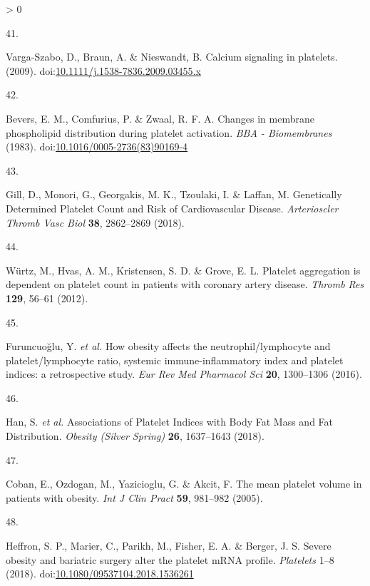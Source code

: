 \documentclass[11pt,twoside]{bristolthesis}
\newlength{\cslhangindent}
\newlength{\csllabelwidth}
\newenvironment{CSLReferences}[2] %
 {%
  \setlength{\parindent}{0pt}
  \ifodd #1 \everypar{\setlength{\hangindent}{\cslhangindent}}\ignorespaces\fi
  \ifnum #2 > 0
  \setlength{\parskip}{#2\baselineskip}
  \fi
 }%
 {}
\newcommand{\CSLLeftMargin}[1]{\parbox[t]{\csllabelwidth}{#1}}
\newcommand{\CSLRightInline}[1]{\parbox[t]{\linewidth - \csllabelwidth}{#1}\break}
\begin{document}
\begin{CSLReferences}{0}{0}
\leavevmode\hypertarget{ref-Varga-Szabo2009}{}%
\CSLLeftMargin{41. }
\CSLRightInline{Varga-Szabo, D., Braun, A. \& Nieswandt, B. {Calcium signaling in platelets}. (2009). doi:\href{https://doi.org/10.1111/j.1538-7836.2009.03455.x}{10.1111/j.1538-7836.2009.03455.x}}

\leavevmode\hypertarget{ref-Bevers1983}{}%
\CSLLeftMargin{42. }
\CSLRightInline{Bevers, E. M., Comfurius, P. \& Zwaal, R. F. A. {Changes in membrane phospholipid distribution during platelet activation}. \emph{BBA - Biomembranes} (1983). doi:\href{https://doi.org/10.1016/0005-2736(83)90169-4}{10.1016/0005-2736(83)90169-4}}

\leavevmode\hypertarget{ref-Gill2018}{}%
\CSLLeftMargin{43. }
\CSLRightInline{Gill, D., Monori, G., Georgakis, M. K., Tzoulaki, I. \& Laffan, M. {Genetically Determined Platelet Count and Risk of Cardiovascular Disease}. \emph{Arterioscler Thromb Vasc Biol} \textbf{38}, 2862--2869 (2018).}

\leavevmode\hypertarget{ref-Wurtz2012}{}%
\CSLLeftMargin{44. }
\CSLRightInline{Würtz, M., Hvas, A. M., Kristensen, S. D. \& Grove, E. L. {Platelet aggregation is dependent on platelet count in patients with coronary artery disease}. \emph{Thromb Res} \textbf{129}, 56--61 (2012).}

\leavevmode\hypertarget{ref-Furuncuoglu2016}{}%
\CSLLeftMargin{45. }
\CSLRightInline{Furuncuoğlu, Y. \emph{et al.} {How obesity affects the neutrophil/lymphocyte and platelet/lymphocyte ratio, systemic immune-inflammatory index and platelet indices: a retrospective study}. \emph{Eur Rev Med Pharmacol Sci} \textbf{20}, 1300--1306 (2016).}

\leavevmode\hypertarget{ref-Han2018a}{}%
\CSLLeftMargin{46. }
\CSLRightInline{Han, S. \emph{et al.} {Associations of Platelet Indices with Body Fat Mass and Fat Distribution}. \emph{Obesity (Silver Spring)} \textbf{26}, 1637--1643 (2018).}

\leavevmode\hypertarget{ref-Coban2005}{}%
\CSLLeftMargin{47. }
\CSLRightInline{Coban, E., Ozdogan, M., Yazicioglu, G. \& Akcit, F. {The mean platelet volume in patients with obesity}. \emph{Int J Clin Pract} \textbf{59}, 981--982 (2005).}

\leavevmode\hypertarget{ref-Heffron2018}{}%
\CSLLeftMargin{48. }
\CSLRightInline{Heffron, S. P., Marier, C., Parikh, M., Fisher, E. A. \& Berger, J. S. {Severe obesity and bariatric surgery alter the platelet mRNA profile}. \emph{Platelets} 1--8 (2018). doi:\href{https://doi.org/10.1080/09537104.2018.1536261}{10.1080/09537104.2018.1536261}}


\end{CSLReferences}
\end{document}
